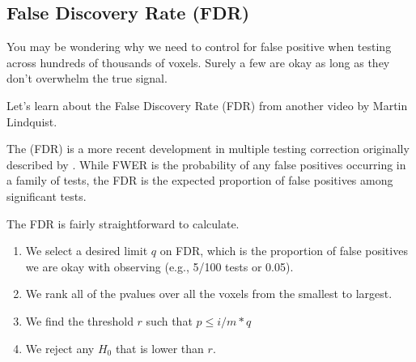 \documentclass[letterpaper,10pt,english]{sphinxmanual}
\begin{document}
\subsection{False Discovery Rate (FDR)}
\label{\detokenize{content/Thresholding_Group_Analyses:false-discovery-rate-fdr}}
You may be wondering why we need to control for  false positive when testing across hundreds of thousands of voxels. Surely a few are okay as long as they don’t overwhelm the true signal.

Let’s learn about the False Discovery Rate (FDR) from another video by Martin Lindquist.

\begin{sphinxVerbatim}[commandchars=\\\{\}]
\end{sphinxVerbatim}

\noindent{}

The  (FDR) is a more recent development in multiple testing correction originally described by . While FWER is the probability of any false positives occurring in a family of tests, the FDR is the expected proportion of false positives among significant tests.

The FDR is fairly straightforward to calculate.
\begin{enumerate}
%
\item {} 
We select a desired limit \(q\) on FDR, which is the proportion of false positives we are okay with observing (e.g., 5/100 tests or 0.05).

\item {} 
We rank all of the p\sphinxhyphen{}values over all the voxels from the smallest to largest.

\item {} 
We find the threshold \(r\) such that \(p \leq i/m * q\)

\item {} 
We reject any \(H_0\) that is lower than \(r\).

\end{enumerate}

\end{document}
